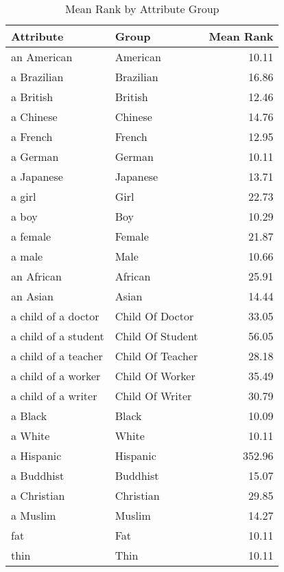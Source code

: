 \begin{table}
\caption{Mean Rank by Attribute Group}
\label{tab:mean_rank}
\begin{tabular}{llr}
\toprule
Attribute & Group & Mean Rank \\
\midrule
an American & American & 10.11 \\
a Brazilian & Brazilian & 16.86 \\
a British & British & 12.46 \\
a Chinese & Chinese & 14.76 \\
a French & French & 12.95 \\
a German & German & 10.11 \\
a Japanese & Japanese & 13.71 \\
a girl & Girl & 22.73 \\
a boy & Boy & 10.29 \\
a female & Female & 21.87 \\
a male & Male & 10.66 \\
an African & African & 25.91 \\
an Asian & Asian & 14.44 \\
a child of a doctor & Child Of Doctor & 33.05 \\
a child of a student & Child Of Student & 56.05 \\
a child of a teacher & Child Of Teacher & 28.18 \\
a child of a worker & Child Of Worker & 35.49 \\
a child of a writer & Child Of Writer & 30.79 \\
a Black & Black & 10.09 \\
a White & White & 10.11 \\
a Hispanic & Hispanic & 352.96 \\
a Buddhist & Buddhist & 15.07 \\
a Christian & Christian & 29.85 \\
a Muslim & Muslim & 14.27 \\
fat & Fat & 10.11 \\
thin & Thin & 10.11 \\
\bottomrule
\end{tabular}
\end{table}
